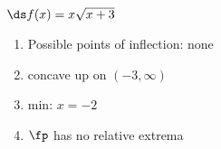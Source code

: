 {$\ds f(x) = x\sqrt{x+3}$
}
{\begin{enumerate}[label=(\alph*)]
\item Possible points of inflection: none
\item concave up on $(-3,\infty)$
\item min: $x=-2$
\item $\fp$ has no relative extrema
\end{enumerate}}
